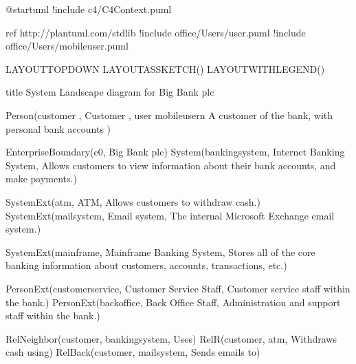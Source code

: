 \documentclass[letterpaper,10pt,english]{sphinxmanual}
\begin{document}
\begin{figure}[htbp]
\centering

\end{figure}

\begin{sphinxVerbatim}[commandchars=\\\{\},numbers=left,firstnumber=1,stepnumber=1]
@startuml
!include \PYGZlt{}c4/C4\PYGZus{}Context.puml\PYGZgt{}  

\PYGZsq{}ref http://plantuml.com/stdlib
!include \PYGZlt{}office/Users/user.puml\PYGZgt{}
!include \PYGZlt{}office/Users/mobile\PYGZus{}user.puml\PYGZgt{}

\PYGZsq{}LAYOUT\PYGZus{}TOP\PYGZus{}DOWN
\PYGZsq{}LAYOUT\PYGZus{}AS\PYGZus{}SKETCH()
LAYOUT\PYGZus{}WITH\PYGZus{}LEGEND()

title System Landscape diagram for Big Bank plc

Person(customer  , Customer , \PYGZdq{}\PYGZlt{}\PYGZdl{}user\PYGZgt{} \PYGZlt{}\PYGZdl{}mobile\PYGZus{}user\PYGZgt{}\PYGZbs{}n A customer of the bank, with personal bank accounts\PYGZdq{} )

Enterprise\PYGZus{}Boundary(c0, \PYGZdq{}Big Bank plc\PYGZdq{}) \PYGZob{}
    System(banking\PYGZus{}system, \PYGZdq{}Internet Banking System\PYGZdq{}, \PYGZdq{}Allows customers to view information about their bank accounts, and make payments.\PYGZdq{})

    System\PYGZus{}Ext(atm, \PYGZdq{}ATM\PYGZdq{}, \PYGZdq{}Allows customers to withdraw cash.\PYGZdq{})
    System\PYGZus{}Ext(mail\PYGZus{}system, \PYGZdq{}E\PYGZhy{}mail system\PYGZdq{}, \PYGZdq{}The internal Microsoft Exchange e\PYGZhy{}mail system.\PYGZdq{})

    System\PYGZus{}Ext(mainframe, \PYGZdq{}Mainframe Banking System\PYGZdq{}, \PYGZdq{}Stores all of the core banking information about customers, accounts, transactions, etc.\PYGZdq{})

    Person\PYGZus{}Ext(customer\PYGZus{}service, \PYGZdq{}Customer Service Staff\PYGZdq{}, \PYGZdq{}Customer service staff within the bank.\PYGZdq{})
    Person\PYGZus{}Ext(back\PYGZus{}office, \PYGZdq{}Back Office Staff\PYGZdq{}, \PYGZdq{}Administration and support staff within the bank.\PYGZdq{})
\PYGZcb{}

Rel\PYGZus{}Neighbor(customer, banking\PYGZus{}system, \PYGZdq{}Uses\PYGZdq{})
Rel\PYGZus{}R(customer, atm, \PYGZdq{}Withdraws cash using\PYGZdq{})
Rel\PYGZus{}Back(customer, mail\PYGZus{}system, \PYGZdq{}Sends e\PYGZhy{}mails to\PYGZdq{})


\end{sphinxVerbatim}
\end{document}
